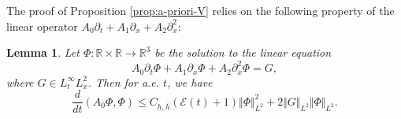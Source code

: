 \documentclass[reqno,11pt]{amsart}
\theoremstyle{plain}
\newtheorem{lemma}[theorem]{Lemma}
\newtheorem{proposition}[theorem]{Proposition}
\theoremstyle{definition}
\numberwithin{equation}{section}
\begin{document}
The proof of Proposition \ref{prop:a-priori-V} relies on the following property of the linear operator $ A_0 \partial_t + A_1 \partial_x + A_2 \partial_x^2$:
\begin{lemma}
\label{LemmaPhi}
    Let $\Phi: \mathbb R \times \mathbb R \to \mathbb R^3$ be the solution to the linear equation
    \begin{equation}
    \label{PhiEq}
    A_0\partial_t \Phi+A_1\partial_x \Phi+A_2\partial_x^2 \Phi=G,
    \end{equation}
    where $G\in L_t^{\infty}L^2_x$. Then for a.e. $ t $, we have
    \begin{equation}
    \label{LemmaPhiEstimate}
        \frac{d}{dt} (A_0 \Phi,\Phi) \leq C_{\underline h, \overline h} (\mathcal E(t) + 1) \Vert\Phi\Vert_{L^2}^2+ 2 \Vert G\Vert_{L^2} \Vert\Phi\Vert_{L^2}.
    \end{equation}
\end{lemma}
\end{document}
